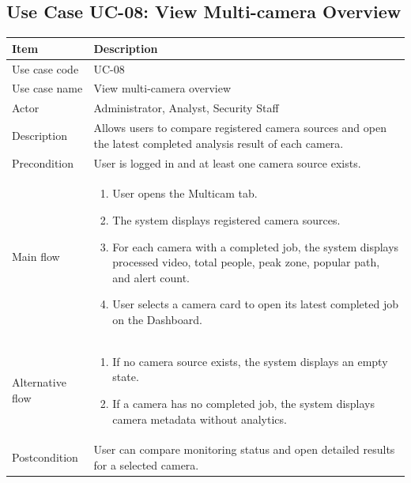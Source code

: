 \documentclass[12pt,a4paper]{report}
\begin{document}
\subsection{Use Case UC-08: View Multi-camera Overview}
\begin{longtable}{|p{3.6cm}|p{10.4cm}|}
\hline
\rowcolor{HeaderBlue}\textbf{Item} & \textbf{Description} \\
\hline
Use case code & UC-08 \\
\hline
Use case name & View multi-camera overview \\
\hline
Actor & Administrator, Analyst, Security Staff \\
\hline
Description & Allows users to compare registered camera sources and open the latest completed analysis result of each camera. \\
\hline
Precondition & User is logged in and at least one camera source exists. \\
\hline
Main flow &
\begin{enumerate}
    \item User opens the Multicam tab.
    \item The system displays registered camera sources.
    \item For each camera with a completed job, the system displays processed video, total people, peak zone, popular path, and alert count.
    \item User selects a camera card to open its latest completed job on the Dashboard.
\end{enumerate} \\
\hline
Alternative flow &
\begin{enumerate}
    \item If no camera source exists, the system displays an empty state.
    \item If a camera has no completed job, the system displays camera metadata without analytics.
\end{enumerate} \\
\hline
Postcondition & User can compare monitoring status and open detailed results for a selected camera. \\
\hline
\end{longtable}
\end{document}
